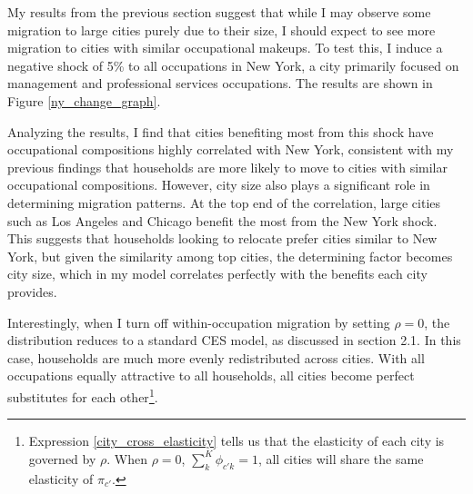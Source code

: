 \documentclass[10pt]{article}
\begin{document}
My results from the previous section suggest that while I may observe some migration to large cities purely due to their size, I should expect to see more migration to cities with similar occupational makeups. To test this, I induce a negative shock of 5\% to all occupations in New York, a city primarily focused on management and professional services occupations. The results are shown in Figure \ref{ny_change_graph}.

Analyzing the results, I find that cities benefiting most from this shock have occupational compositions highly correlated with New York, consistent with my previous findings that households are more likely to move to cities with similar occupational compositions. However, city size also plays a significant role in determining migration patterns. At the top end of the correlation, large cities such as Los Angeles and Chicago benefit the most from the New York shock. This suggests that households looking to relocate prefer cities similar to New York, but given the similarity among top cities, the determining factor becomes city size, which in my model correlates perfectly with the benefits each city provides.

Interestingly, when I turn off within-occupation migration by setting $\rho = 0$, the distribution reduces to a standard CES model, as discussed in section 2.1. In this case, households are much more evenly redistributed across cities. With all occupations equally attractive to all households, all cities become perfect substitutes for each other\footnote{Expression \ref{city_cross_elasticity} tells us that the elasticity of each city is governed by $\rho$. When $\rho = 0$, $\sum_{k}^{K} \phi_{c'k} = 1$, all cities will share the same elasticity of $\pi_{c'}.$}.
\end{document}
